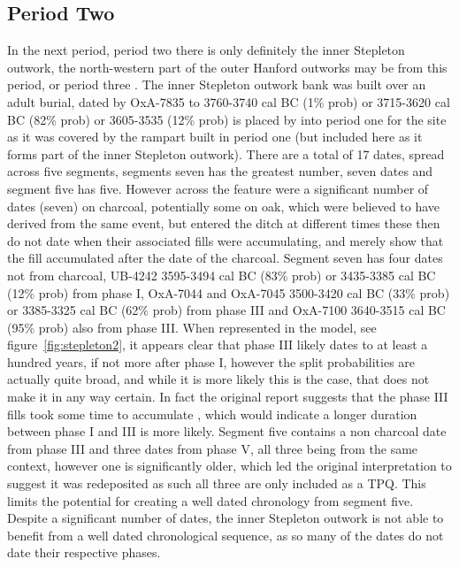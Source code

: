 \subsection{Period Two}
In the next period, period two there is only definitely the inner Stepleton outwork, the north-western part of the outer Hanford outworks may be from this period, or period three \citep[141]{Whittle:2011kl}. The inner Stepleton outwork bank was built over an adult burial, dated by OxA-7835 to 3760-3740 cal BC (1\% prob) or 3715-3620 cal BC (82\% prob) or 3605-3535 (12\% prob) is placed by \citep[139]{Whittle:2011kl} into period one for the site as it was covered by the rampart built in period one (but included here as it forms part of the inner Stepleton outwork). There are a total of 17 dates, spread across five segments, segments seven has the greatest number, seven dates and segment five has five. However across the feature were a significant number of dates (seven) on charcoal, potentially some on oak, which were believed to have derived from the same event, but entered the ditch at different times \citep[395]{Mercer:2008fk} these then do not date when their associated fills were accumulating, and merely show that the fill accumulated after the date of the charcoal. Segment seven has four dates not from charcoal, UB-4242 3595-3494 cal BC (83\% prob) or 3435-3385 cal BC (12\% prob) from phase I, OxA-7044 and OxA-7045 3500-3420 cal BC (33\% prob) or 3385-3325 cal BC (62\% prob) from phase III and OxA-7100 3640-3515 cal BC (95\% prob) also from phase III. When represented in the model, see figure~\ref{fig:stepleton2}, it appears clear that phase III likely dates to at least a hundred years, if not more after phase I, however the split probabilities are actually quite broad, and while it is more likely this is the case, that does not make it in any way certain. In fact the original report suggests that the phase III fills took some time to accumulate \citep[395]{Mercer:2008fk}, which would indicate a longer duration between phase I and III is more likely. Segment five contains a non charcoal date from phase III and three dates from phase V, all three being from the same context, however one is significantly older, which led the original interpretation to suggest it was redeposited \citep[396]{Mercer:2008fk} as such all three are only included as a TPQ. This limits the potential for creating a well dated chronology from segment five. Despite a significant number of dates, the inner Stepleton outwork is not able to benefit from a well dated chronological sequence, as so many of the dates do not date their respective phases.

